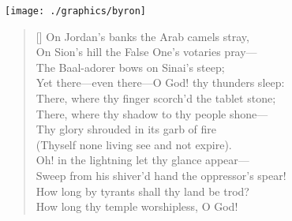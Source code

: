 \clearpage

\hspace*{85pt}\texttt{[image: ./graphics/byron]}
\par
  
\label{pg:byron}
\begin{verse}[\versewidth]
On Jordan's banks the Arab camels stray,\\
On Sion's hill the False One's votaries pray---\\
The Baal-adorer bows on Sinai's steep;\\
Yet there---even there---O God! thy thunders sleep:\\
\bigskip
There, where thy finger scorch'd the tablet stone;\\
There, where thy shadow to thy people shone---\\
Thy glory shrouded in its garb of fire\\
(Thyself none living see and not expire).\\
\bigskip
Oh! in the lightning let thy glance appear---\\
Sweep from his shiver'd hand the oppressor's spear!\\
How long by tyrants shall thy land be trod?\\
How long thy temple worshipless, O God!\\
\end{verse}



\clearpage


